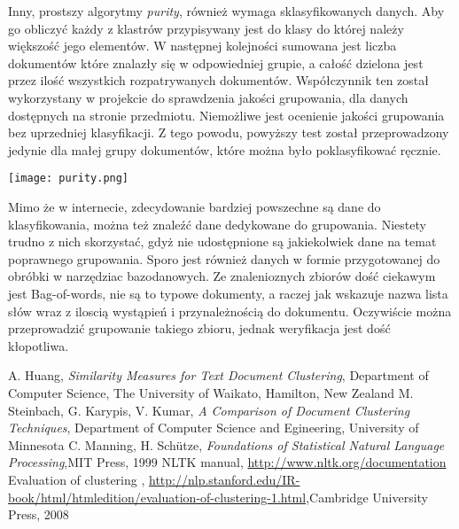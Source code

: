 \documentclass{article}
\begin{document}
Inny, prostszy algorytmy \emph{purity}, również wymaga sklasyfikowanych danych. Aby go obliczyć każdy z klastrów przypisywany jest do klasy do której należy większość jego elementów. W następnej kolejności sumowana jest liczba dokumentów które znalazły się w odpowiedniej grupie, a całość dzielona jest przez ilość wszystkich rozpatrywanych dokumentów. Współczynnik ten został wykorzystany w projekcie do sprawdzenia jakości grupowania, dla danych dostępnych na stronie przedmiotu. Niemożliwe jest ocenienie jakości grupowania bez uprzedniej klasyfikacji. Z tego powodu, powyższy test został przeprowadzony jedynie dla małej grupy dokumentów, które można było poklasyfikować ręcznie.

\begin{center}
\texttt{[image: purity.png]}
\end{center}

Mimo że w internecie, zdecydowanie bardziej powszechne są dane do klasyfikowania, można też znaleźć dane dedykowane do grupowania. Niestety trudno z nich skorzystać, gdyż nie udostępnione są jakiekolwiek dane na temat poprawnego grupowania. Sporo jest również danych w formie przygotowanej do obróbki w narzędziac bazodanowych. 
Ze znalenioznych zbiorów dość ciekawym jest Bag-of-words, nie są to typowe dokumenty, a raczej jak wskazuje nazwa lista słów wraz z iloscią wystąpień i przynależnością do dokumentu. Oczywiście można przeprowadzić grupowanie takiego zbioru, jednak weryfikacja jest dość kłopotliwa.

\begin{thebibliography}{9}
A. Huang, \emph{Similarity Measures for Text Document Clustering}, Department of Computer Science, The University of Waikato, Hamilton, New Zealand
M. Steinbach, G. Karypis, V. Kumar, \emph{A Comparison of Document Clustering Techniques}, Department of Computer Science and Egineering, University of Minnesota
C. Manning, H. Schütze, \emph{Foundations of Statistical Natural Language Processing},MIT Press, 1999
NLTK manual, \url{http://www.nltk.org/documentation}
Evaluation of clustering , \url{http://nlp.stanford.edu/IR-book/html/htmledition/evaluation-of-clustering-1.html},Cambridge University Press, 2008
\end{thebibliography}
\end{document}
